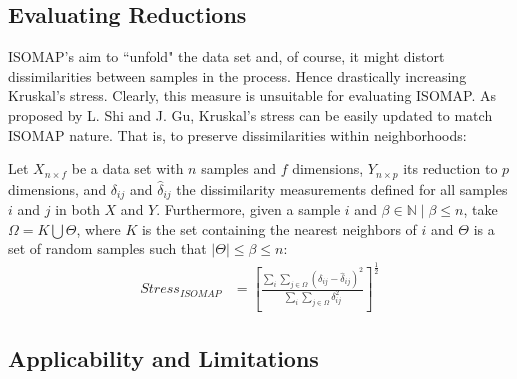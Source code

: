 \documentclass[12pt]{report}
\begin{document}
\subsection{Evaluating Reductions}

ISOMAP's aim to ``unfold" the data set and, of course, it might distort dissimilarities between samples in the process. Hence drastically increasing Kruskal's stress. Clearly, this measure is unsuitable for evaluating ISOMAP. As proposed by L. Shi and J. Gu, Kruskal's stress can be easily updated to match ISOMAP nature. That is, to preserve dissimilarities within neighborhoods: \cite{shi2012fast}

Let $X_{n \times f}$ be a data set with $n$ samples and $f$ dimensions, $Y_{n \times p}$ its reduction to $p$ dimensions, and $\delta_{ij}$ and $\hat{\delta}_{ij}$ the dissimilarity measurements defined for all samples $i$ and $j$ in both $X$ and $Y$. Furthermore, given a sample $i$ and $\beta \in \mathbb{N} \mid \beta \le n$, take $\Omega=K \bigcup \Theta$, where $K$ is the set containing the nearest neighbors of $i$ and $\Theta$ is a set of random samples such that $|\Theta| \le \beta \le n$:
\begin{align*}
	Stress_{ISOMAP} &= [\frac{\sum_i \sum_{j \in \Omega} (\delta_{ij} - \hat{\delta}_{ij})^2}{\sum_i \sum_{j \in \Omega} \delta_{ij}^2}]^{\frac{1}{2}}
\end{align*}

\subsection{Applicability and Limitations}
\end{document}
